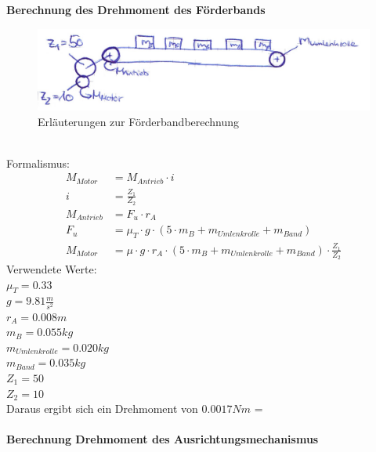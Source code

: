\textbf{Berechnung des Drehmoment des Förderbands}\\
\begin{figure}[h!]
	\centering
	\includegraphics[width=1\textwidth]{Enddokumentation/Anhang/Bilder/FoerderbandSkizze.jpg}
	\caption{Erläuterungen zur Förderbandberechnung}
\end{figure}\\
Formalismus:
\begin{align}
    \label{equ:DrehmomentFörderband}
    M_{Motor} &= M_{Antrieb} \cdot i\\
    i &=\frac{Z_1}{Z_2}\\
    M_{Antrieb} &= F_u \cdot r_A\\
    F_u &= \mu_T \cdot g \cdot \left(5 \cdot m_B + m_{Umlenkrolle} + m_{Band} \right)\\
    M_{Motor} &= \mu \cdot g \cdot r_A \cdot \left(5 \cdot m_B + m_{Umlenkrolle} + m_{Band}\right) \cdot \frac{Z_1}{Z_2}
\end{align}
Verwendete Werte:\\
$\mu_T = 0.33$\\
$g = 9.81\frac{m}{s^2}$\\
$r_A = 0.008 m$\\
$m_B = 0.055 kg$\\
$m_{Umlenkrolle} = 0.020 kg$\\
$m_{Band} = 0.035 kg$\\
$Z_1 = 50$\\
$Z_2 = 10$\\
Daraus ergibt sich ein Drehmoment von $0.0017 Nm$ = \\
\\
\textbf{Berechnung Drehmoment des Ausrichtungsmechanismus}\\
